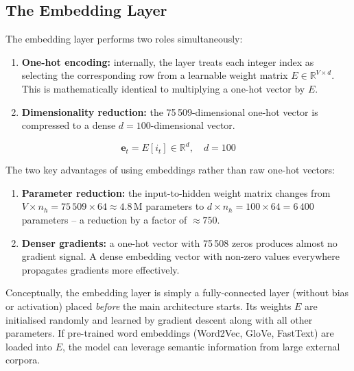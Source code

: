 \documentclass[12pt,a4paper]{article}
\begin{document}
\subsection{The Embedding Layer}
\label{subsec:embedding}

The embedding layer performs two roles simultaneously:

\begin{enumerate}[label=(\alph*)]
  \item \textbf{One-hot encoding:} internally, the layer treats each
        integer index as selecting the corresponding row from a learnable
        weight matrix $E \in \mathbb{R}^{V \times d}$.  This is
        mathematically identical to multiplying a one-hot vector by $E$.
  \item \textbf{Dimensionality reduction:} the 75\,509-dimensional
        one-hot vector is compressed to a dense $d=100$-dimensional
        vector.
\end{enumerate}

\begin{equation}
  \mathbf{e}_t = E[i_t] \in \mathbb{R}^{d}, \quad d = 100
  \label{eq:embedding}
\end{equation}

The two key advantages of using embeddings rather than raw one-hot
vectors:

\begin{enumerate}[noitemsep]
  \item \textbf{Parameter reduction:} the input-to-hidden weight
        matrix changes from $V \times n_h = 75\,509 \times 64
        \approx 4.8$\,M parameters to $d \times n_h = 100 \times 64
        = 6\,400$ parameters -- a reduction by a factor of $\approx 750$.
  \item \textbf{Denser gradients:} a one-hot vector with 75\,508 zeros
        produces almost no gradient signal.  A dense embedding vector
        with non-zero values everywhere propagates gradients more
        effectively.
\end{enumerate}

\begin{keyinsight}[title=Embedding Layer as Fully-Connected Layer]
  Conceptually, the embedding layer is simply a fully-connected layer
  (without bias or activation) placed \emph{before} the main
  architecture starts.  Its weights $E$ are initialised randomly and
  learned by gradient descent along with all other parameters.  If
  pre-trained word embeddings (Word2Vec, GloVe, FastText) are loaded
  into $E$, the model can leverage semantic information from large
  external corpora.
\end{keyinsight}
\end{document}
